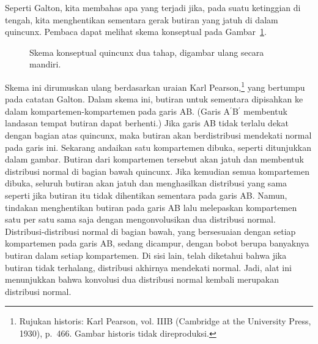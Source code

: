 \par
Seperti Galton, kita membahas apa yang terjadi jika, pada suatu ketinggian di tengah, kita menghentikan
sementara gerak butiran yang jatuh di dalam quincunx.  Pembaca dapat melihat
skema konseptual pada Gambar~\ref{fig 9.62}.
\begin{figure}[ht]
\centering
{}
\caption{Skema konseptual quincunx dua tahap, digambar ulang secara mandiri.}
\label{fig 9.62}
\end{figure}
Skema ini dirumuskan ulang berdasarkan uraian Karl Pearson,\footnote{Rujukan historis: Karl Pearson,  vol. IIIB (Cambridge at the University Press,
1930), p.~466. Gambar historis tidak direproduksi.} yang bertumpu pada catatan
Galton.  Dalam skema ini, butiran untuk sementara
dipisahkan ke dalam kompartemen-kompartemen pada garis AB.  (Garis
A$^{\prime}$B$^{\prime}$ membentuk landasan tempat butiran dapat berhenti.)  Jika garis AB tidak
terlalu dekat dengan bagian atas quincunx, maka butiran akan berdistribusi mendekati normal pada
garis ini.  Sekarang andaikan satu kompartemen dibuka, seperti ditunjukkan dalam gambar.  Butiran
dari kompartemen tersebut akan jatuh dan membentuk distribusi normal di bagian bawah quincunx.
Jika kemudian semua kompartemen dibuka, seluruh butiran akan jatuh dan menghasilkan distribusi
yang sama seperti jika butiran itu tidak dihentikan sementara pada garis AB.  Namun, tindakan
menghentikan butiran pada garis AB lalu melepaskan kompartemen satu per satu sama saja dengan
mengonvolusikan dua distribusi normal.  Distribusi-distribusi normal di bagian bawah, yang
bersesuaian dengan setiap kompartemen pada garis AB, sedang dicampur, dengan bobot berupa banyaknya
butiran dalam setiap kompartemen.  Di sisi lain, telah diketahui bahwa jika butiran tidak
terhalang, distribusi akhirnya mendekati normal.  Jadi, alat ini menunjukkan bahwa konvolusi dua
distribusi normal kembali merupakan distribusi normal.
